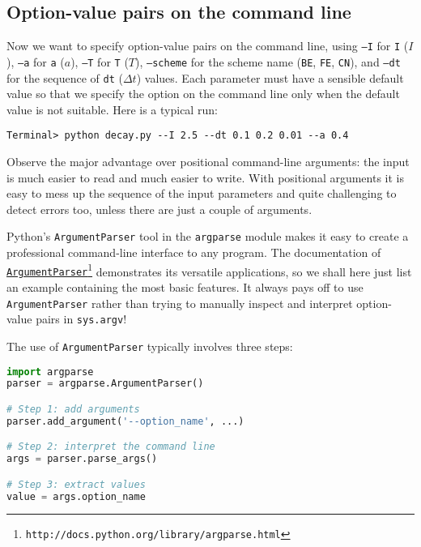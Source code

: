 \documentclass[graybox,sectrefs,envcountresetchap,open=right,final]{svmonodo}
\begin{document}
\subsection{Option-value pairs on the command line}
\label{softeng1:basic:UI:options_cml}


Now we want to specify option-value pairs on the command line,
using \texttt{--I} for \texttt{I} ($I$), \texttt{--a} for \texttt{a} ($a$), \texttt{--T} for \texttt{T} ($T$),
\texttt{--scheme} for the scheme name (\texttt{BE}, \texttt{FE}, \texttt{CN}),
and \texttt{--dt} for the sequence of \texttt{dt} ($\Delta t$) values.
Each parameter must have a sensible default value so
that we specify the option on the command line only when the default
value is not suitable. Here is a typical run:

\begin{Verbatim}[frame=lines,label=\fbox{{\tiny Terminal}},framesep=2.5mm,framerule=0.7pt,fontsize=\fontsize{9pt}{9pt}]
Terminal> python decay.py --I 2.5 --dt 0.1 0.2 0.01 --a 0.4
\end{Verbatim}
Observe the major advantage over positional command-line arguments:
the input is much easier to read and much easier to write.
With positional arguments it is easy to mess up the sequence of
the input parameters and quite challenging to detect errors too,
unless there are just a couple of arguments.

Python's \texttt{ArgumentParser} tool in the \texttt{argparse} module makes it easy
to create a professional command-line interface to any program. The
documentation of \href{{http://docs.python.org/library/argparse.html}}{\nolinkurl{ArgumentParser}\footnote{\texttt{http://docs.python.org/library/argparse.html}}} demonstrates its
versatile applications, so we shall here just list an example
containing the most basic features. It always pays off to use \texttt{ArgumentParser}
rather than trying to manually inspect and interpret option-value pairs
in \texttt{sys.argv}!

The use of \texttt{ArgumentParser} typically involves three steps:

\begin{lstlisting}[language=Python,style=blue1_bluegreen]
import argparse
parser = argparse.ArgumentParser()

# Step 1: add arguments
parser.add_argument('--option_name', ...)

# Step 2: interpret the command line
args = parser.parse_args()

# Step 3: extract values
value = args.option_name
\end{lstlisting}
\end{document}
